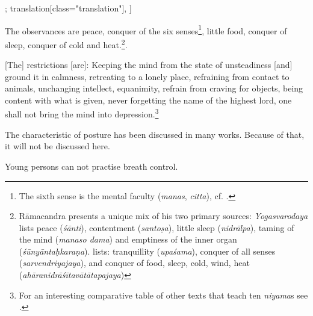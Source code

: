 \begin{alignment}[
  texts=edition[class="edition"];
  translation[class="translation"],
  ]
\begin{translation}
\begin{tlate}
The observances are peace, conquer of the six senses\footnote{The sixth sense is the mental faculty (\textit{manas}, \textit{citta}), cf. \citeauthor[2021:18]{white2021}.}, little food, conquer of sleep, conquer of cold and heat.\footnote{Rāmacandra presents a unique mix of his two primary sources: \textit{Yogasvarodaya} lists peace (\textit{śānti}), contentment (\textit{santoṣa}), little sleep (\textit{nidrālpa}), taming of the mind (\textit{manaso dama}) and emptiness of the inner organ (\textit{śūnyāntaḥkaraṇa}).  lists: tranquillity (\textit{upaśama}), conquer of all senses (\textit{sarvendriyajaya}), and conquer of food, sleep, cold, wind, heat (\textit{ahāranidrāśītavātātapajaya})}.

[The] restrictions [are]: Keeping the mind from the state of unsteadiness [and] ground it in calmness, retreating to a lonely place, refraining from contact to animals, unchanging intellect, equanimity, refrain from craving for objects, being content with what is given, never forgetting the name of the highest lord, one shall not bring the mind into depression.\footnote{For an interesting comparative table of other texts that teach ten \textit{niyama}s see \citeauthor[2023:196]{shivayogapradipika}.}

The characteristic of posture has been discussed in many works. Because of that, it will not be discussed here.

Young persons can not practise breath control.
\clearpage
\end{tlate}
\end{translation}
\end{alignment}
\pagebreak %
